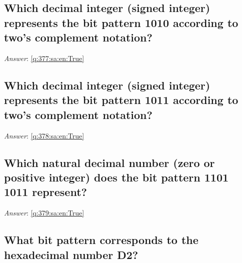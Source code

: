\documentclass[a4paper,11pt,oneside]{article}
\begin{document}
\begin{sloppypar}
\subsection{Which decimal integer (signed integer) represents the bit pattern 1010 according to two{\textquoteright}s complement notation?}

\label{q:377:sa:en:False}

\vspace{2cm}

\noindent\makebox[\textwidth]{\hrulefill}

\vspace{1cm}

\textit{Answer}: \autoref{q:377:sa:en:True}



\subsection{Which decimal integer (signed integer) represents the bit pattern 1011 according to two{\textquoteright}s complement notation?}

\label{q:378:sa:en:False}

\vspace{2cm}

\noindent\makebox[\textwidth]{\hrulefill}

\vspace{1cm}

\textit{Answer}: \autoref{q:378:sa:en:True}



\subsection{Which natural decimal number (zero or positive integer) does the bit pattern 1101 1011 represent?}

\label{q:379:sa:en:False}

\vspace{2cm}

\noindent\makebox[\textwidth]{\hrulefill}

\vspace{1cm}

\textit{Answer}: \autoref{q:379:sa:en:True}



\subsection{What bit pattern corresponds to the hexadecimal number D2?}


\end{sloppypar}
\end{document}
